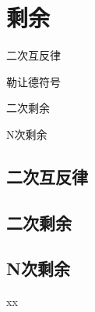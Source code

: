 \chapter{剩余}

\begin{introduction}
\item 二次互反律
\item 勒让德符号
\item 二次剩余
\item N次剩余
\end{introduction}


\section{二次互反律}

\section{二次剩余}

\section{N次剩余}


\begin{problemset}
	\item xx
\end{problemset}